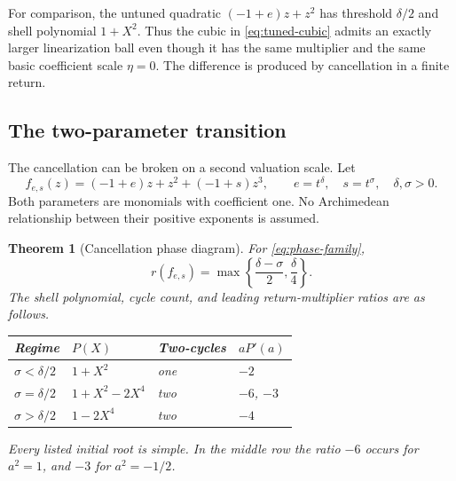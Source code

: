 \documentclass[11pt,letterpaper]{article}
\numberwithin{equation}{section}
\theoremstyle{plain}
\newtheorem{theorem}{Theorem}[section]
\theoremstyle{definition}
\theoremstyle{remark}
\begin{document}
For comparison, the untuned quadratic $(-1+e)z+z^2$ has threshold
$\delta/2$ and shell polynomial $1+X^2$. Thus the cubic in
\eqref{eq:tuned-cubic} admits an exactly larger linearization ball even
though it has the same multiplier and the same basic coefficient scale
$\eta=0$. The difference is produced by cancellation in a finite return.

\subsection{The two-parameter transition}

The cancellation can be broken on a second valuation scale. Let
\begin{equation}\label{eq:phase-family}
 f_{e,s}(z)=(-1+e)z+z^2+(-1+s)z^3,
 \qquad e=t^\delta,\quad s=t^\sigma,
 \quad\delta,\sigma>0.
\end{equation}
Both parameters are monomials with coefficient one. No Archimedean
relationship between their positive exponents is assumed.

\begin{theorem}[Cancellation phase diagram]\label{thm:phase}
For \eqref{eq:phase-family},
\begin{equation}\label{eq:phase-r}
 \boxed{\displaystyle
 r(f_{e,s})=\max\left\{\frac{\delta-\sigma}{2},
                         \frac\delta4\right\}.}
\end{equation}
The shell polynomial, cycle count, and leading return-multiplier ratios are
as follows.
\begin{center}
\small
\begin{tabular}{@{}llll@{}}
\toprule
Regime & $P(X)$ & Two-cycles & $aP'(a)$\\
\midrule
$\sigma<\delta/2$ & $1+X^2$ & one & $-2$\\
$\sigma=\delta/2$ & $1+X^2-2X^4$ & two & $-6$, $-3$\\
$\sigma>\delta/2$ & $1-2X^4$ & two & $-4$\\
\bottomrule
\end{tabular}
\end{center}
Every listed initial root is simple. In the middle row the ratio $-6$
occurs for $a^2=1$, and $-3$ for $a^2=-1/2$.
\end{theorem}
\end{document}
